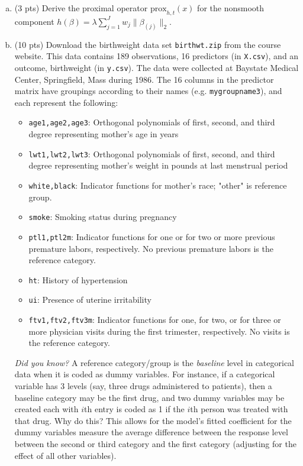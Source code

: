 \documentclass{article}
\theoremstyle{remark}
\theoremstyle{definition}
\begin{document}
\begin{enumerate}[(a)]

\item (3 pts) Derive the proximal operator $\text{prox}_{h,t}(x)$ for the
  nonsmooth component $h(\beta) = \lambda \sum_{j=1}^J w_j
  \|\beta_{(j)}\|_2$.

\item (10 pts) Download the birthweight data set \texttt{birthwt.zip}
  from the course website. This data contains 189
  observations, 16 predictors (in \texttt{X.csv}), and an outcome, birthweight
  (in \texttt{y.csv}). The data were collected at Baystate Medical Center,
  Springfield, Mass during 1986. The 16 columns in the predictor matrix have
  groupings according to their names (e.g. \texttt{mygroupname3}), and each
  represent the following:
  \begin{itemize}
  \item \texttt{age1,age2,age3}: Orthogonal polynomials of first, second, and third degree
    representing mother’s age in years
  \item \texttt{lwt1,lwt2,lwt3}: Orthogonal polynomials of first, second, and third degree
    representing mother’s weight in pounds at last menstrual period
  \item \texttt{white,black}: Indicator functions for mother’s race; "other" is reference
    group.
  \item \texttt{smoke}: Smoking status during pregnancy
  \item \texttt{ptl1,ptl2m}: Indicator functions for one or for two or more
    previous premature labors, respectively.  No previous premature labors is
    the reference category.
  \item \texttt{ht}: History of hypertension
  \item \texttt{ui}: Presence of uterine irritability
  \item \texttt{ftv1,ftv2,ftv3m}: Indicator functions for one, for two, or for
    three or more physician visits during the first trimester, respectively. No
    visits is the reference category. 
  \end{itemize}

  {\Large {}} \textit{Did you know?} A reference category/group is the
  \textit{baseline} level in categorical data when it is coded as dummy
  variables. For instance, if a categorical variable has 3 levels (say, three
  drugs administered to patients), then a baseline category may be the first
  drug, and two dummy variables may be created each with $i$th entry is coded
  as 1 if the $i$th person was treated with that drug. Why do this? This allows
  for the model's fitted coefficient for the dummy variables measure the average
  difference between the response level between the second or third category and
  the first category (adjusting for the effect of all other variables).


\end{enumerate}
\end{document}
